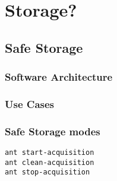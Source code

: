 \chapter{Storage?}

\section{Safe Storage}

\subsection{Software Architecture}

\subsection{Use Cases}

\subsection{Safe Storage modes}

\begin{verbatim}
ant start-acquisition
ant clean-acquisition
ant stop-acquisition
\end{verbatim}
